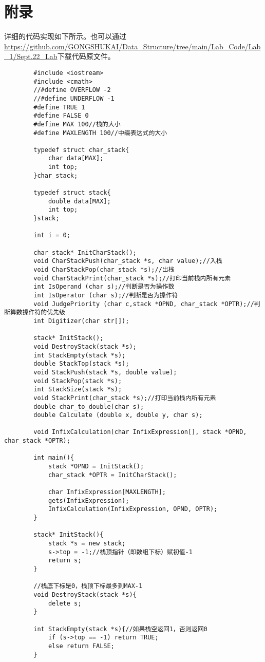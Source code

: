 \documentclass[10pt,a4paper]{article}
\begin{document}
	\section{附录}
	\noindent 详细的代码实现如下所示。也可以通过\url{https://github.com/GONGSHUKAI/Data_Structure/tree/main/Lab_Code/Lab_1/Sept.22_Lab}下载代码原文件。
	\begin{verbatim}
		#include <iostream>
		#include <cmath>
		//#define OVERFLOW -2
		//#define UNDERFLOW -1
		#define TRUE 1
		#define FALSE 0
		#define MAX 100//栈的大小
		#define MAXLENGTH 100//中缀表达式的大小
		
		typedef struct char_stack{
			char data[MAX];
			int top;
		}char_stack;
		
		typedef struct stack{
			double data[MAX];
			int top;
		}stack;
		
		int i = 0;
		
		char_stack* InitCharStack();
		void CharStackPush(char_stack *s, char value);//入栈
		void CharStackPop(char_stack *s);//出栈
		void CharStackPrint(char_stack *s);//打印当前栈内所有元素
		int IsOperand (char s);//判断是否为操作数
		int IsOperator (char s);//判断是否为操作符
		void JudgePriority (char c,stack *OPND, char_stack *OPTR);//判断算数操作符的优先级
		int Digitizer(char str[]);
		
		stack* InitStack();
		void DestroyStack(stack *s);
		int StackEmpty(stack *s);
		double StackTop(stack *s);
		void StackPush(stack *s, double value);
		void StackPop(stack *s);
		int StackSize(stack *s);
		void StackPrint(char_stack *s);//打印当前栈内所有元素
		double char_to_double(char s);
		double Calculate (double x, double y, char s);
		
		void InfixCalculation(char InfixExpression[], stack *OPND, char_stack *OPTR);
		
		int main(){
			stack *OPND = InitStack();
			char_stack *OPTR = InitCharStack();
			
			char InfixExpression[MAXLENGTH];
			gets(InfixExpression);
			InfixCalculation(InfixExpression, OPND, OPTR);
		}
		
		stack* InitStack(){
			stack *s = new stack;
			s->top = -1;//栈顶指针（即数组下标）赋初值-1
			return s;
		}
		
		//栈底下标是0，栈顶下标最多到MAX-1
		void DestroyStack(stack *s){
			delete s;
		}
		
		int StackEmpty(stack *s){//如果栈空返回1，否则返回0
			if (s->top == -1) return TRUE;
			else return FALSE;
		}
		

\end{verbatim}
\end{document}

